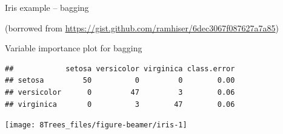 \documentclass[10pt,ignorenonframetext,]{beamer}
\newenvironment{Shaded}{\begin{snugshade}}{\end{snugshade}}
\newcommand{\KeywordTok}[1]{\textcolor[rgb]{0.13,0.29,0.53}{\textbf{#1}}}
\newcommand{\DataTypeTok}[1]{\textcolor[rgb]{0.13,0.29,0.53}{#1}}
\newcommand{\DecValTok}[1]{\textcolor[rgb]{0.00,0.00,0.81}{#1}}
\newcommand{\StringTok}[1]{\textcolor[rgb]{0.31,0.60,0.02}{#1}}
\newcommand{\OperatorTok}[1]{\textcolor[rgb]{0.81,0.36,0.00}{\textbf{#1}}}
\newcommand{\NormalTok}[1]{#1}
\begin{document}
\begin{frame}[fragile]

\begin{block}{Iris example -- bagging}

\tiny
(borrowed from
\url{https://gist.github.com/ramhiser/6dec3067f087627a7a85})

\vspace{1mm}

\normalsize
Variable importance plot for bagging

\scriptsize

\begin{Shaded}
\end{Shaded}

\begin{verbatim}
##            setosa versicolor virginica class.error
## setosa         50          0         0        0.00
## versicolor      0         47         3        0.06
## virginica       0          3        47        0.06
\end{verbatim}

\begin{center}\texttt{[image: 8Trees\_files/figure-beamer/iris-1]} \end{center}

\end{block}

\end{frame}
\end{document}
